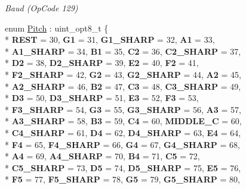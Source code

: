 \begin{DoxyCompactItemize}
\begin{DoxyCompactList}\small\item\em Baud (Op\+Code 129) \end{DoxyCompactList}\item 
\hypertarget{namespaceroomba_aa553ae759298da7895bffd70162d9479}{enum \hyperlink{namespaceroomba_aa553ae759298da7895bffd70162d9479}{Pitch} \+: uint\+\_\+opt8\+\_\+t \{ \\*
{\bfseries R\+E\+S\+T} = 30, 
{\bfseries G1} = 31, 
{\bfseries G1\+\_\+\+S\+H\+A\+R\+P} = 32, 
{\bfseries A1} = 33, 
\\*
{\bfseries A1\+\_\+\+S\+H\+A\+R\+P} = 34, 
{\bfseries B1} = 35, 
{\bfseries C2} = 36, 
{\bfseries C2\+\_\+\+S\+H\+A\+R\+P} = 37, 
\\*
{\bfseries D2} = 38, 
{\bfseries D2\+\_\+\+S\+H\+A\+R\+P} = 39, 
{\bfseries E2} = 40, 
{\bfseries F2} = 41, 
\\*
{\bfseries F2\+\_\+\+S\+H\+A\+R\+P} = 42, 
{\bfseries G2} = 43, 
{\bfseries G2\+\_\+\+S\+H\+A\+R\+P} = 44, 
{\bfseries A2} = 45, 
\\*
{\bfseries A2\+\_\+\+S\+H\+A\+R\+P} = 46, 
{\bfseries B2} = 47, 
{\bfseries C3} = 48, 
{\bfseries C3\+\_\+\+S\+H\+A\+R\+P} = 49, 
\\*
{\bfseries D3} = 50, 
{\bfseries D3\+\_\+\+S\+H\+A\+R\+P} = 51, 
{\bfseries E3} = 52, 
{\bfseries F3} = 53, 
\\*
{\bfseries F3\+\_\+\+S\+H\+A\+R\+P} = 54, 
{\bfseries G3} = 55, 
{\bfseries G3\+\_\+\+S\+H\+A\+R\+P} = 56, 
{\bfseries A3} = 57, 
\\*
{\bfseries A3\+\_\+\+S\+H\+A\+R\+P} = 58, 
{\bfseries B3} = 59, 
{\bfseries C4} = 60, 
{\bfseries M\+I\+D\+D\+L\+E\+\_\+\+C} = 60, 
\\*
{\bfseries C4\+\_\+\+S\+H\+A\+R\+P} = 61, 
{\bfseries D4} = 62, 
{\bfseries D4\+\_\+\+S\+H\+A\+R\+P} = 63, 
{\bfseries E4} = 64, 
\\*
{\bfseries F4} = 65, 
{\bfseries F4\+\_\+\+S\+H\+A\+R\+P} = 66, 
{\bfseries G4} = 67, 
{\bfseries G4\+\_\+\+S\+H\+A\+R\+P} = 68, 
\\*
{\bfseries A4} = 69, 
{\bfseries A4\+\_\+\+S\+H\+A\+R\+P} = 70, 
{\bfseries B4} = 71, 
{\bfseries C5} = 72, 
\\*
{\bfseries C5\+\_\+\+S\+H\+A\+R\+P} = 73, 
{\bfseries D5} = 74, 
{\bfseries D5\+\_\+\+S\+H\+A\+R\+P} = 75, 
{\bfseries E5} = 76, 
\\*
{\bfseries F5} = 77, 
{\bfseries F5\+\_\+\+S\+H\+A\+R\+P} = 78, 
{\bfseries G5} = 79, 
{\bfseries G5\+\_\+\+S\+H\+A\+R\+P} = 80, 
}
\end{DoxyCompactItemize}
